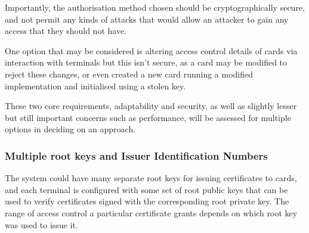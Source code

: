 \documentclass[12pt]{article}
\begin{document}
Importantly, the authorisation method chosen should be cryptographically secure, and not permit any kinds of attacks that would allow an attacker to gain any access that they should not have.

One option that may be considered is altering access control details of cards via interaction with terminals but this isn't secure, as a card may be modified to reject these changes, or even created a new card running a modified implementation and initialised using a stolen key.

These two core requirements, adaptability and security, as well as slightly lesser but still important concerns such as performance, will be assessed for multiple options in deciding on an approach.

\subsubsection{Multiple root keys and Issuer Identification Numbers}

The system could have many separate root keys for issuing certificates to cards, and each terminal is configured with some set of root public keys that can be used to verify certificates signed with the corresponding root private key. The range of access control a particular certificate grants depends on which root key was used to issue it.
\end{document}
